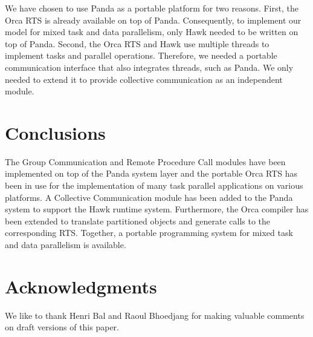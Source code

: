 \documentclass{article}
\begin{document}
We have chosen to use Panda as a portable platform for two reasons.
First, the Orca RTS is already available on top of Panda.
Consequently, to implement our model for mixed task and data
parallelism, only Hawk needed to be written on top of Panda. Second,
the Orca RTS and Hawk use multiple threads to implement tasks and
parallel operations. Therefore, we needed a portable communication
interface that also integrates threads, such as Panda. We only needed
to extend it to provide collective communication as an independent
module.

\section{Conclusions}
\label{sec:conclusions}

The Group Communication and Remote Procedure Call modules have been
implemented on top of the Panda system layer and the portable Orca RTS
has been in use for the implementation of many task parallel
applications on various platforms. A Collective Communication module
has been added to the Panda system to support the Hawk runtime system.
Furthermore, the Orca compiler has been extended to translate
partitioned objects and generate calls to the corresponding RTS.
Together, a portable programming system for mixed task and data
parallelism is available.

\section*{Acknowledgments}

We like to thank Henri Bal and Raoul Bhoedjang for making valuable
comments on draft versions of this paper.




\end{document}
